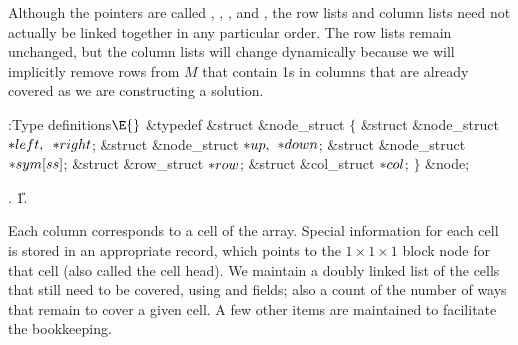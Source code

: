 Although the pointers are called , , ,
and , the row
lists and column lists need not actually be linked together in any particular
order. The row lists remain unchanged, but the column lists will change
dynamically because we will implicitly remove rows from $M$ that contain 1s in
columns that are already covered as we are constructing a solution.

\Y\B\4:Type definitions\X${}\E{}$\6
\&{typedef} \&{struct} \&{node\_struct} ${}\{{}$\1\6
\&{struct} \&{node\_struct} ${}{*}\\{left},{}$ ${}{*}\\{right}{}$;\6
\&{struct} \&{node\_struct} ${}{*}\\{up},{}$ ${}{*}\\{down}{}$;\6
\&{struct} \&{node\_struct} ${}{*}\\{sym}[\\{ss}]{}$;\6
\&{struct} \&{row\_struct} ${}{*}\\{row}{}$;\6
\&{struct} \&{col\_struct} ${}{*}\\{col}{}$;\2\6
${}\}{}$ \&{node};\par
{}.
\U1.\fi

Each column corresponds to a cell of the array. Special
information for
each cell is stored in an appropriate record, which points to the
$1\times1\times1$ block node for that cell (also called the cell head).
We maintain a doubly linked list of the
cells that still need to be covered, using  and 
fields;
also a count of the number of ways that remain to cover a given cell.
A few other items are maintained to facilitate the bookkeeping.

